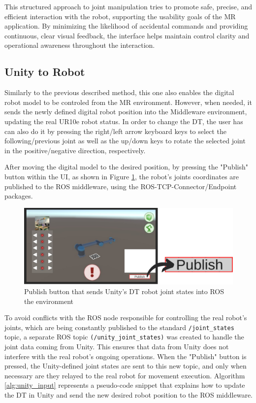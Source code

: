 This structured approach to joint manipulation tries to promote safe, precise, and efficient interaction with the robot, supporting the usability goals of the \ac{MR} application. By minimizing the likelihood of accidental commands and providing continuous, clear visual feedback, the interface helps maintain control clarity and operational awareness throughout the interaction.


\subsection{Unity to Robot}
Similarly to the previous described method, this one also enables the digital robot model to be controled from the \ac{MR} environment. However, when needed, it sends the newly defined digital robot position into the Middleware environment, updating the real UR10e robot status. In order to change the \ac{DT}, the user has can also do it by pressing the right/left arrow keyboard keys to select the following/previous joint as well as the up/down keys to rotate the selected joint in the positive/negative direction, respectively.
        
After moving the digital model to the desired position, by pressing the "Publish" button within the \ac{UI}, as shown in Figure \ref{fig:publish_UI_button}, the robot's joints coordinates are published to the \ac{ROS} middleware, using the \ac{ROS}-\ac{TCP}-Connector/Endpoint packages.


\begin{figure}[htpb]
    \centering
    \includegraphics[width=0.8\linewidth]{figs/publish-button.png}
    \caption{Publish button that sends Unity's \ac{DT} robot joint states into ROS the environment}
    \label{fig:publish_UI_button}
\end{figure}

To avoid conflicts with the \ac{ROS} node responsible for controlling the real robot's joints, which are being constantly published to the standard \texttt{/joint\_states} topic, a separate \ac{ROS} topic \texttt{(/unity\_joint\_states)} was created to handle the joint data coming from Unity. This ensures that data from Unity does not interfere with the real robot’s ongoing operations. When the "Publish" button is pressed, the Unity-defined joint states are sent to this new topic, and only when necessary are they relayed to the real robot for movement execution. Algorithm \ref{alg:unity_input} represents a pseudo-code snippet that explains how to update the \ac{DT} in Unity and send the new desired robot position to the \ac{ROS} middleware.

